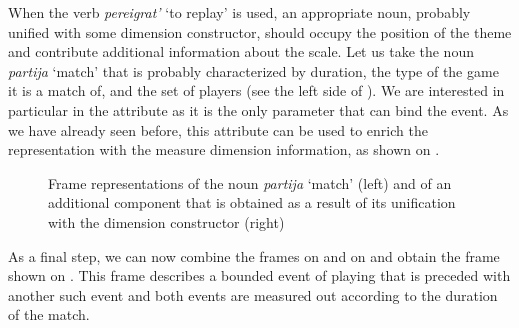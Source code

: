 When the verb \textit{pereigrat'} `to replay' is used, an appropriate noun, probably unified with some dimension constructor, should occupy the position of the theme and contribute additional information about the scale. Let us take the noun \textit{partija} `match' that is probably characterized by duration, the type of the game it is a match of, and the set of players (see the left side of ). We are interested in particular in the \DURATION attribute as it is the only parameter that can bind the event. As we have already seen before, this attribute can be used to enrich the representation with the measure dimension information, as shown on .

\begin{figure}\small
\hfill%
\caption{Frame representations of the noun \textit{partija} `match' (left) and of an additional component that is obtained as a result of its unification with the dimension constructor (right) \label{frame:match}}
\end{figure}

As a final step, we can now combine the frames on  and on  and obtain the frame shown on . This frame describes a bounded event of playing that is preceded with another such event and both events are measured out according to the duration of the match. 

